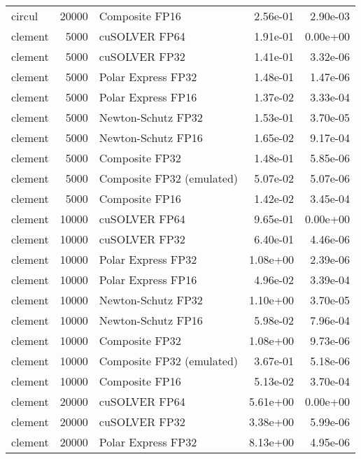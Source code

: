 \begin{table}
\begin{tabular}{lrlrr}
   circul & 20000 &            Composite FP16 &  2.56e-01 &        2.90e-03 \\
  clement &  5000 &             cuSOLVER FP64 &  1.91e-01 &        0.00e+00 \\
  clement &  5000 &             cuSOLVER FP32 &  1.41e-01 &        3.32e-06 \\
  clement &  5000 &        Polar Express FP32 &  1.48e-01 &        1.47e-06 \\
  clement &  5000 &        Polar Express FP16 &  1.37e-02 &        3.33e-04 \\
  clement &  5000 &        Newton-Schutz FP32 &  1.53e-01 &        3.70e-05 \\
  clement &  5000 &        Newton-Schutz FP16 &  1.65e-02 &        9.17e-04 \\
  clement &  5000 &            Composite FP32 &  1.48e-01 &        5.85e-06 \\
  clement &  5000 & Composite FP32 (emulated) &  5.07e-02 &        5.07e-06 \\
  clement &  5000 &            Composite FP16 &  1.42e-02 &        3.45e-04 \\
  clement & 10000 &             cuSOLVER FP64 &  9.65e-01 &        0.00e+00 \\
  clement & 10000 &             cuSOLVER FP32 &  6.40e-01 &        4.46e-06 \\
  clement & 10000 &        Polar Express FP32 &  1.08e+00 &        2.39e-06 \\
  clement & 10000 &        Polar Express FP16 &  4.96e-02 &        3.39e-04 \\
  clement & 10000 &        Newton-Schutz FP32 &  1.10e+00 &        3.70e-05 \\
  clement & 10000 &        Newton-Schutz FP16 &  5.98e-02 &        7.96e-04 \\
  clement & 10000 &            Composite FP32 &  1.08e+00 &        9.73e-06 \\
  clement & 10000 & Composite FP32 (emulated) &  3.67e-01 &        5.18e-06 \\
  clement & 10000 &            Composite FP16 &  5.13e-02 &        3.70e-04 \\
  clement & 20000 &             cuSOLVER FP64 &  5.61e+00 &        0.00e+00 \\
  clement & 20000 &             cuSOLVER FP32 &  3.38e+00 &        5.99e-06 \\
  clement & 20000 &        Polar Express FP32 &  8.13e+00 &        4.95e-06 \\

\end{tabular}
\end{table}
